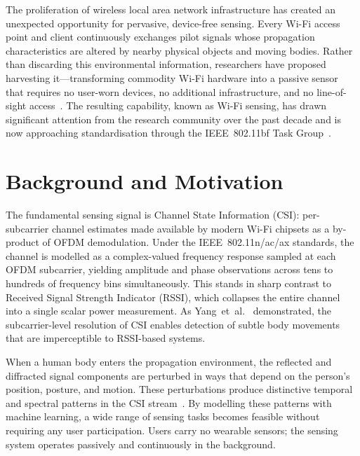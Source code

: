 \documentclass[english,bibtex]{kththesis}
\begin{document}
%
The proliferation of wireless local area network infrastructure has created an unexpected opportunity for pervasive, device-free sensing. Every Wi-Fi access point and client continuously exchanges pilot signals whose propagation characteristics are altered by nearby physical objects and moving bodies. Rather than discarding this environmental information, researchers have proposed harvesting it---transforming commodity Wi-Fi hardware into a passive sensor that requires no user-worn devices, no additional infrastructure, and no line-of-sight access~\cite{ma2019wifi}. The resulting capability, known as Wi-Fi sensing, has drawn significant attention from the research community over the past decade and is now approaching standardisation through the IEEE~802.11bf Task Group~\cite{du2025overview}.

\section{Background and Motivation}
\label{sec:intro-background}

%
The fundamental sensing signal is Channel State Information (CSI): per-subcarrier channel estimates made available by modern Wi-Fi chipsets as a by-product of OFDM demodulation. Under the IEEE~802.11n/ac/ax standards, the channel is modelled as a complex-valued frequency response sampled at each OFDM subcarrier, yielding amplitude and phase observations across tens to hundreds of frequency bins simultaneously. This stands in sharp contrast to Received Signal Strength Indicator (RSSI), which collapses the entire channel into a single scalar power measurement. As Yang~et~al.~\cite{yang2013from} demonstrated, the subcarrier-level resolution of CSI enables detection of subtle body movements that are imperceptible to RSSI-based systems.

When a human body enters the propagation environment, the reflected and diffracted signal components are perturbed in ways that depend on the person's position, posture, and motion. These perturbations produce distinctive temporal and spectral patterns in the CSI stream~\cite{wilson2010radio,wang2015understanding}. By modelling these patterns with machine learning, a wide range of sensing tasks becomes feasible without requiring any user participation. Users carry no wearable sensors; the sensing system operates passively and continuously in the background.
\end{document}
